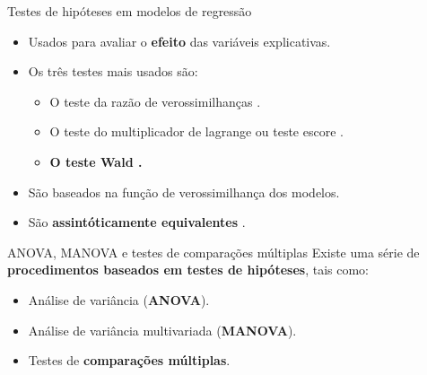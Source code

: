 \documentclass[
  ignorenonframetext,
  serif,
  professionalfont,
  usenames,
  dvipsnames,
  aspectratio = 169]{beamer}
\begin{document}
\begin{frame}{Testes de hipóteses em modelos de regressão}
\protect\hypertarget{testes-de-hipuxf3teses-em-modelos-de-regressuxe3o}{}
\begin{itemize}
    \itemsep 2ex
  
  \item Usados para avaliar o \textbf{efeito} das variáveis explicativas.
  
  \item Os três testes mais usados são:

    \begin{itemize}
      \item O teste da razão de verossimilhanças \citep{trv}.
      \item O teste do multiplicador de lagrange ou teste escore \citep{score1,score2,score3}.
      \item \textbf{O teste Wald \citep{wald}.}
    \end{itemize}
  
  \item São baseados na função de verossimilhança dos modelos.
  
  \item São \textbf{assintóticamente equivalentes} \citep{engle}.
  
  \end{itemize}
\end{frame}

\begin{frame}{ANOVA, MANOVA e testes de comparações múltiplas}
\protect\hypertarget{anova-manova-e-testes-de-comparauxe7uxf5es-muxfaltiplas}{}
Existe uma série de
\textbf{procedimentos baseados em testes de hipóteses}, tais como:

\begin{itemize}

  \itemsep 2ex
  
  \item Análise de variância (\textbf{ANOVA}).
  \item Análise de variância multivariada (\textbf{MANOVA}).
  \item Testes de \textbf{comparações múltiplas}.

\end{itemize}
\end{frame}
\end{document}
